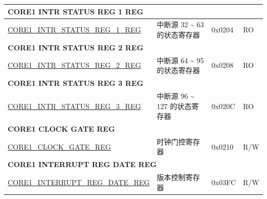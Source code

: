 \begin{longtable}{ | p{7.5cm} | p{7.2cm} | p{1.3cm} | p{1cm} | }
\multicolumn{4}{|l|}{\textbf{CORE1 INTR STATUS REG 1 REG}} \\ \hline
\hyperref[regdesc:CORE1INTRSTATUSREG1REG]{CORE1\_INTR\_STATUS\_REG\_1\_REG} & 中断源 32 \~{} 63 的状态寄存器 & 0x0204 & RO \\ \hline
\multicolumn{4}{|l|}{\textbf{CORE1 INTR STATUS REG 2 REG}} \\ \hline
\hyperref[regdesc:CORE1INTRSTATUSREG2REG]{CORE1\_INTR\_STATUS\_REG\_2\_REG} & 中断源 64 \~{} 95 的状态寄存器 & 0x0208 & RO \\ \hline
\multicolumn{4}{|l|}{\textbf{CORE1 INTR STATUS REG 3 REG}} \\ \hline
\hyperref[regdesc:CORE1INTRSTATUSREG3REG]{CORE1\_INTR\_STATUS\_REG\_3\_REG} & 中断源 96 \~{} 127 的状态寄存器 & 0x020C & RO \\ \hline
\multicolumn{4}{|l|}{\textbf{CORE1 CLOCK GATE REG}} \\ \hline
\hyperref[regdesc:CORE1CLOCKGATEREG]{CORE1\_CLOCK\_GATE\_REG} & 时钟门控寄存器 & 0x0210 & R/W \\ \hline
\multicolumn{4}{|l|}{\textbf{CORE1 INTERRUPT REG DATE REG}} \\ \hline
\hyperref[regdesc:CORE1INTERRUPTREGDATEREG]{CORE1\_INTERRUPT\_REG\_DATE\_REG} & 版本控制寄存器 & 0x03FC & R/W \\ \hline
\end{longtable}
